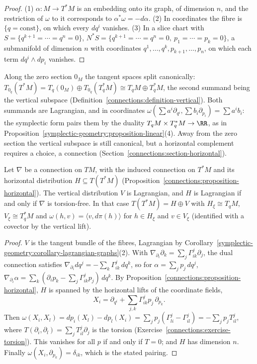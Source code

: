 \begin{proof}
(1) $\alpha \colon M \to T^*M$ is an embedding onto its graph, of dimension $n$, and the restriction of $\omega$ to it corresponds to $\alpha^*\omega = -d\alpha$. (2) In coordinates the fibre is
$\{q = \text{const}\}$, on which every $dq^i$ vanishes. (3) In a slice chart with $S = \{q^{k+1} = \cdots = q^n = 0\}$, $N^*S = \{q^{k+1} = \cdots = q^n = 0, \ p_1 = \cdots = p_k = 0\}$, a submanifold of dimension
$n$ with coordinates $q^1, \ldots, q^k, p_{k+1}, \ldots, p_n$, on which each term $dq^i \wedge dp_i$ vanishes.
\end{proof}

Along the zero section $0_M$ the tangent spaces split canonically: $T_{0_q}(T^*M) = T_q(0_M) \oplus T_{0_q}(T^*_qM) \cong T_qM \oplus T^*_qM$, the second summand being the vertical subspace
(Definition~\ref{connections:definition-vertical}). Both summands are Lagrangian, and in coordinates $\omega(\sum a^i\partial_{q^i}, \sum b_i\partial_{p_i}) = \sum a^ib_i$: the symplectic form pairs them by the
duality $T_qM \times T_q^*M \to \RR$, as in Proposition~\ref{symplectic-geometry:proposition-linear}(4). Away from the zero section the vertical subspace is still canonical, but a horizontal complement requires a
choice, a connection (Section~\ref{connections:section-horizontal}).

\begin{proposition}\label{symplectic-geometry:proposition-connection-lagrangian}
Let $\nabla$ be a connection on $TM$, with the induced connection on $T^*M$ and its horizontal distribution $H \subseteq T(T^*M)$ (Proposition~\ref{connections:proposition-horizontal}). The vertical
distribution $V$ is Lagrangian, and $H$ is Lagrangian if and only if $\nabla$ is torsion-free. In that case $T(T^*M) = H \oplus V$ with $H_\xi \cong T_qM$, $V_\xi \cong T^*_qM$ and
$\omega(h, v) = \langle v, d\pi(h)\rangle$ for $h \in H_\xi$ and $v \in V_\xi$ (identified with a covector by the vertical lift).
\end{proposition}

\begin{proof}
$V$ is the tangent bundle of the fibres, Lagrangian by Corollary~\ref{symplectic-geometry:corollary-lagrangian-graphs}(2). With $\nabla_{\partial_i}\partial_k = \sum_j\Gamma^j_{ik}\partial_j$, the dual connection
satisfies $\nabla_{\partial_i}dq^j = -\sum_k\Gamma^j_{ik}\,dq^k$, so for $\alpha = \sum_jp_j\,dq^j$, $\nabla_{\partial_i}\alpha = \sum_k(\partial_ip_k - \sum_j\Gamma^j_{ik}p_j)\,dq^k$. By
Proposition~\ref{connections:proposition-horizontal}, $H$ is spanned by the horizontal lifts of the coordinate fields,
\[
X_i = \partial_{q^i} + \sum_{j,k}\Gamma^j_{ik}p_j\,\partial_{p_k}.
\]
Then $\omega(X_i, X_l) = dp_i(X_l) - dp_l(X_i) = \sum_jp_j(\Gamma^j_{li} - \Gamma^j_{il}) = -\sum_jp_jT^j_{il}$, where $T(\partial_i, \partial_l) = \sum_jT^j_{il}\partial_j$ is the torsion
(Exercise~\ref{connections:exercise-torsion}). This vanishes for all $p$ if and only if $T = 0$; and $H$ has dimension $n$. Finally $\omega(X_i, \partial_{p_k}) = \delta_{ik}$, which is the stated pairing.
\end{proof}

